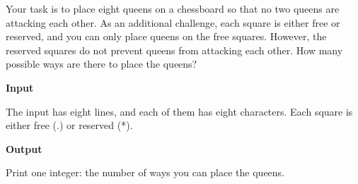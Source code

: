 Your task is to place eight queens on a chessboard so that no two queens are attacking each other. As an additional challenge, each square is either free or reserved, and you can only place queens on the free squares. However, the reserved squares do not prevent queens from attacking each other.
How many possible ways are there to place the queens?

\vspace{0.3cm}\noindent\textbf{Input}

The input has eight lines, and each of them has eight characters. Each square is either free (.) or reserved (*).

\vspace{0.3cm}\noindent\textbf{Output}

Print one integer: the number of ways you can place the queens.